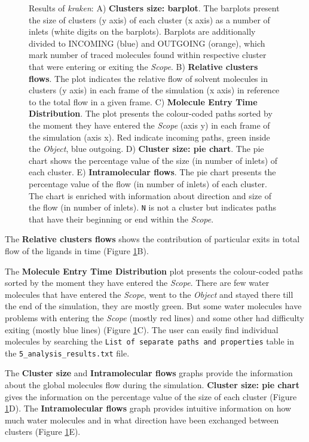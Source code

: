 \documentclass[9pt,tutorial]{livecoms}
\begin{document}
\begin{figure}[hptb!]
\caption{Results of \textit{kraken}: A) \textbf{Clusters size: barplot}. The barplots present the size of clusters (y axis) of each cluster (x axis) as a number of inlets (white digits on the barplots). Barplots are additionally divided to INCOMING (blue) and OUTGOING (orange), which mark number of traced molecules found within respective cluster that were entering or exiting the \textit{Scope}. B) \textbf{Relative clusters flows}. The plot indicates the relative flow of solvent molecules in clusters (y axis) in each frame of the simulation (x axis) in reference to the total flow in a given frame. C) \textbf{Molecule Entry Time Distribution}. The plot presents the colour-coded paths sorted by the moment they have entered the \textit{Scope} (axis y) in each frame of the simulation (axis x). Red indicate incoming paths, green inside the \textit{Object}, blue outgoing. D) \textbf{Cluster size: pie chart}. The pie chart shows the percentage value of the size (in number of inlets) of each cluster. E) \textbf{Intramolecular flows}. The pie chart presents the percentage value of the flow (in number of inlets) of  each cluster. The chart is enriched with information about direction and size of the flow (in number of inlets). \texttt{N} is not a cluster but indicates paths that have their beginning or end within the \emph{Scope}.}
\label{Tut3.1}
\end{figure}

The \textbf{Relative clusters flows} shows the contribution of particular exits in total flow of the ligands in time ({Figure \ref{Tut3.1}B}).

The \textbf{Molecule Entry Time Distribution} plot presents the colour-coded paths sorted by the moment they have entered the \textit{Scope}. There are few water molecules that have entered the \textit{Scope}, went to the \textit{Object} and stayed there till the end of the simulation, they are mostly green. But some water molecules have problems with entering the \textit{Scope} (mostly red lines) and some other had difficulty exiting (mostly blue lines) (Figure \ref{Tut3.1}C). The user can easily find individual molecules by searching the \texttt{List of separate paths and properties} table in the \texttt{5\_analysis\_results.txt} file.

The \textbf{Cluster size} and \textbf{Intramolecular flows} graphs provide the information about the global molecules flow during the simulation. \textbf{Cluster size: pie chart} gives the information on the percentage value of the size of each cluster (Figure \ref{Tut3.1}D). The \textbf{Intramolecular flows} graph provides intuitive information on how much water molecules and in what direction have been exchanged between clusters (Figure \ref{Tut3.1}E). 
\end{document}
